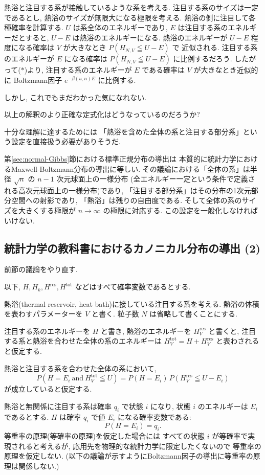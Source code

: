 \documentclass[12pt,twoside]{jarticle}
\newcommand\Hres{H^{\operatorname{res}}}
\newcommand\Htot{H^{\operatorname{tot}}}
\theoremstyle{jplain}
\theoremstyle{jplain}
\theoremstyle{jplain}
\numberwithin{theorem}{section}
\numberwithin{equation}{section}
\numberwithin{figure}{section}
\numberwithin{table}{section}
\newcommand\secref[1]{第\ref{#1}節}
\begin{document}
熱浴と注目する系が接触しているような系を考える.
注目する系のサイズは一定であるとし, 熱浴のサイズが無限大になる極限を考える.
熱浴の側に注目して各種確率を計算する.
$U$ は系全体のエネルギーであり, 
$E$ は注目する系のエネルギーだとすると, 
$U-E$ は熱浴のエネルギーになる.
熱浴のエネルギーが $U-E$ 程度になる確率は $V$ が大きなとき $P(H_{N,V}\leqq U-E)$ で
近似される. 
注目する系のエネルギーが $E$ になる確率は $P(H_{N,V}\leqq U-E)$ に比例するだろう.
したがって($*$)より, 
注目する系のエネルギーが $E$ である確率は $V$ が大きなとき近似的に
Boltzmann因子 $e^{-\beta(u,n)E}$ に比例する.

しかし, これでもまだわかった気になれない.

以上の解釈のより正確な定式化はどうなっているのだろうか?

十分な理解に達するためには
「熱浴を含めた全体の系と注目する部分系」という設定を直接扱う必要がありそうだ.

\secref{sec:normal-Gibbs}における標準正規分布の導出は
本質的に統計力学におけるMaxwell-Boltzmann分布の導出に等しい.
その議論における「全体の系」は半径 $\sqrt{n}$ の $n-1$ 次元球面上の一様分布
(全エネルギー一定という条件で定義される高次元球面上の一様分布)であり, 
「注目する部分系」はその分布の1次元部分空間への射影であり, 
「熱浴」は残りの自由度である.
そして全体の系のサイズを大きくする極限が $n\to\infty$ の極限に対応する.
この設定を一般化しなければいけない.


\subsection{統計力学の教科書におけるカノニカル分布の導出 (2)}
\label{sec:thermal-reservoir}

前節の議論をやり直す.

以下, $H,H_k,\Hres, \Htot$ などはすべて確率変数であるとする.

熱浴(thermal reservoir, heat bath)に接している注目する系を考える.
熱浴の体積を表わすパラメーターを $V$ と書く.
粒子数 $N$ は省略して書くことにする.

注目する系のエネルギーを $H$ と書き, 熱浴のエネルギーを $\Hres_V$ と書くと, 
注目する系と熱浴を合わせた全体の系のエネルギーは $\Htot_V=H+\Hres_V$ と表わされる
と仮定する.

熱浴と注目する系を合わせた全体の系において, 
\[
P(H=E_i\ \text{and}\ \Htot_V\leqq U)
=
P(H=E_i)\,P(\Hres_V\leqq U-E_i)
\tag{1}
\]
が成立していると仮定する.

熱浴と無関係に注目する系は確率 $q_i$ で状態 $i$ になり, 
状態 $i$ のエネルギーは $E_i$ であるとする.
$H$ は確率 $q_i$ で値 $E_i$ になる確率変数である:
\[
P(H=E_i)=q_i.
\tag{2}
\]
等重率の原理(等確率の原理)を仮定した場合には
すべての状態 $i$ が等確率で実現されると考えるが, 
応用先を物理的な統計力学に限定したくないので
等重率の原理を仮定しない.
(以下の議論が示すようにBoltzmann因子の導出に等重率の原理は関係しない.)
\end{document}
